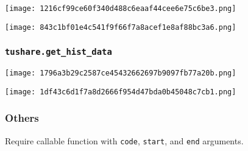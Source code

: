 \begin{Shaded}
\begin{Highlighting}[]

\OperatorTok{=} 
\OperatorTok{=} \NormalTok{, }
\OperatorTok{=} 
\OperatorTok{=} 

\OperatorTok{=}
\end{Highlighting}
\end{Shaded}

\texttt{[image: 1216cf99ce60f340d488c6eaaf44cee6e75c6be3.png]}

\texttt{[image: 843c1bf01e4c541f9f66f7a8acef1e8af88bc3a6.png]}

\hypertarget{tushareget_hist_data}{%
\subsubsection{\texorpdfstring{\texttt{tushare.get\_hist\_data}}{tushare.get\_hist\_data}}\label{tushareget_hist_data}}

\begin{Shaded}
\begin{Highlighting}[]

\OperatorTok{=} \StringTok{\textquotesingle{}600848\textquotesingle{}}
\OperatorTok{=} \NormalTok{, }
\OperatorTok{=} 
\OperatorTok{=} 

\OperatorTok{=}
\end{Highlighting}
\end{Shaded}

\texttt{[image: 1796a3b29c2587ce45432662697b9097fb77a20b.png]}

\texttt{[image: 1df43c6d1f7a8d2666f954d47bda0b45048c7cb1.png]}

\hypertarget{others}{%
\subsubsection{Others}\label{others}}

Require callable function with \texttt{code}, \texttt{start}, and
\texttt{end} arguments.
